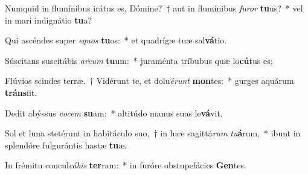 \item Numquid in flumínibus irátus es, Dómine?~† aut in flumínibus \textit{fu}\textit{ror} \textbf{tu}us?~* vel in mari indignátio \textbf{tu}a?
\item Qui ascéndes super \textit{e}\textit{quos} \textbf{tu}os:~* et quadrígæ tuæ sal\textbf{vá}tio.
\item Súscitans suscitábis \textit{ar}\textit{cum} \textbf{tu}um:~* juraménta tríbubus quæ lo\textbf{cú}tus es;
\item Flúvios scindes terræ.~† Vidérunt te, et dolu\textit{é}\textit{runt} \textbf{mon}tes:~* gurges aquárum \textbf{tráns}iit.
\item Dedit abýssus \textit{vo}\textit{cem} \textbf{su}am:~* altitúdo manus suas le\textbf{vá}vit.
\item Sol et luna stetérunt in habitáculo suo,~† in luce sagittá\textit{rum} \textit{tu}\textbf{á}rum,~* ibunt in splendóre fulgurántis hastæ \textbf{tu}æ.
\item In frémitu concul\textit{cá}\textit{bis} \textbf{ter}ram:~* in furóre obstupefácies \textbf{Gen}tes.
